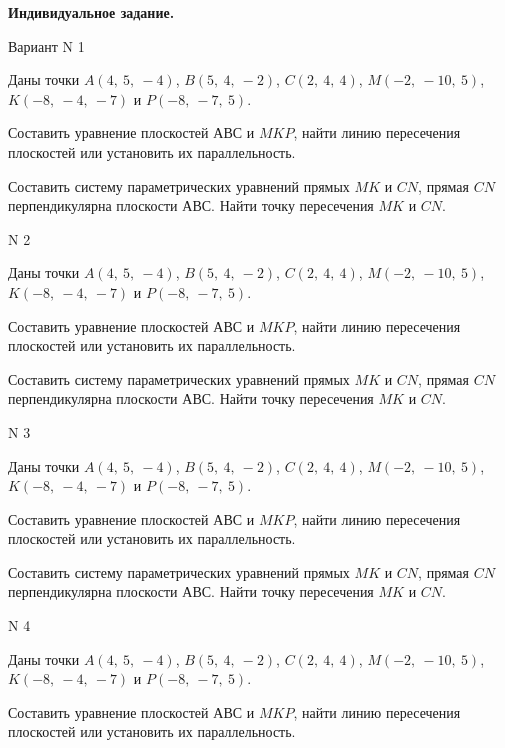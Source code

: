 \documentclass[11pt]{report}
\begin{document}
\pagestyle{empty}

{\bf Индивидуальное задание.}

Вариант N 1

Даны точки $A\left( 4, \  5, \  -4\right)$, $B\left( 5, \  4, \  -2\right)$, $C\left( 2, \  4, \  4\right)$, $M\left( -2, \  -10, \  5\right)$, $K\left( -8, \  -4, \  -7\right)$ и $P\left( -8, \  -7, \  5\right)$.


Составить уравнение плоскостей $АВС$ и $MKP$,
найти линию пересечения плоскостей или установить их параллельность.

Составить систему параметрических уравнений прямых $MK$ и $CN$,
прямая $CN$ перпендикулярна плоскости $АВС$. 
Найти точку пересечения $MK$ и $CN$.



 N 2

Даны точки $A\left( 4, \  5, \  -4\right)$, $B\left( 5, \  4, \  -2\right)$, $C\left( 2, \  4, \  4\right)$, $M\left( -2, \  -10, \  5\right)$, $K\left( -8, \  -4, \  -7\right)$ и $P\left( -8, \  -7, \  5\right)$.


Составить уравнение плоскостей $АВС$ и $MKP$,
найти линию пересечения плоскостей или установить их параллельность.

Составить систему параметрических уравнений прямых $MK$ и $CN$,
прямая $CN$ перпендикулярна плоскости $АВС$. 
Найти точку пересечения $MK$ и $CN$.



 N 3

Даны точки $A\left( 4, \  5, \  -4\right)$, $B\left( 5, \  4, \  -2\right)$, $C\left( 2, \  4, \  4\right)$, $M\left( -2, \  -10, \  5\right)$, $K\left( -8, \  -4, \  -7\right)$ и $P\left( -8, \  -7, \  5\right)$.


Составить уравнение плоскостей $АВС$ и $MKP$,
найти линию пересечения плоскостей или установить их параллельность.

Составить систему параметрических уравнений прямых $MK$ и $CN$,
прямая $CN$ перпендикулярна плоскости $АВС$. 
Найти точку пересечения $MK$ и $CN$.



 N 4

Даны точки $A\left( 4, \  5, \  -4\right)$, $B\left( 5, \  4, \  -2\right)$, $C\left( 2, \  4, \  4\right)$, $M\left( -2, \  -10, \  5\right)$, $K\left( -8, \  -4, \  -7\right)$ и $P\left( -8, \  -7, \  5\right)$.


Составить уравнение плоскостей $АВС$ и $MKP$,
найти линию пересечения плоскостей или установить их параллельность.
\end{document}
